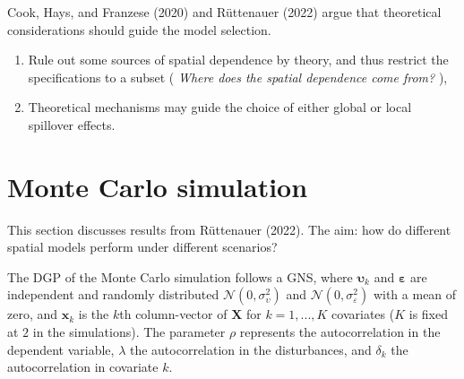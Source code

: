 \documentclass[
  letterpaper,
]{scrbook}
\begin{document}
Cook, Hays, and Franzese (2020) and Rüttenauer (2022) argue that
theoretical considerations should guide the model selection.

\begin{enumerate}
\def\labelenumi{\arabic{enumi})}
\item
  Rule out some sources of spatial dependence by theory, and thus
  restrict the specifications to a subset ( \emph{Where does the spatial
  dependence come from?} ),
\item
  Theoretical mechanisms may guide the choice of either global or local
  spillover effects.
\end{enumerate}

\hypertarget{monte-carlo-simulation}{%
\section{Monte Carlo simulation}\label{monte-carlo-simulation}}

This section discusses results from Rüttenauer (2022). The aim: how do
different spatial models perform under different scenarios?

The DGP of the Monte Carlo simulation follows a GNS, where
\({\boldsymbol{\mathbf{\upsilon}}}_k\) and
\({\boldsymbol{\mathbf{\varepsilon}}}\) are independent and randomly
distributed \(\mathcal{N}(0,\sigma^{2}_\upsilon)\) and
\(\mathcal{N}(0,\sigma^{2}_\varepsilon)\) with a mean of zero, and
\({\boldsymbol{\mathbf{x}}}_k\) is the \(k\)th column-vector of
\({\boldsymbol{\mathbf{X}}}\) for \(k=1,...,K\) covariates (\(K\) is
fixed at \(2\) in the simulations). The parameter \(\rho\) represents
the autocorrelation in the dependent variable, \(\lambda\) the
autocorrelation in the disturbances, and \(\delta_k\) the
autocorrelation in covariate \(k\).
\end{document}
